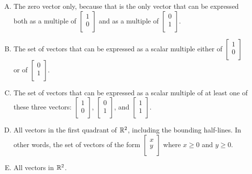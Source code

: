 \documentclass[10pt]{amsart}
\begin{document}
\begin{enumerate}
  \begin{enumerate}[(A)]
  \item The zero vector only, because that is the only vector that can
    be expressed both as a multiple of $\left[\begin{matrix} 1 \\ 0
        \\\end{matrix}\right]$ and as a multiple of
    $\left[\begin{matrix} 0 \\ 1 \\\end{matrix}\right]$.
  \item The set of vectors that can be expressed as a scalar multiple
    either of $\left[\begin{matrix} 1 \\ 0 \\\end{matrix}\right]$ or
    of $\left[\begin{matrix} 0 \\ 1 \\\end{matrix}\right]$.
  \item The set of vectors that can be expressed as a scalar multiple
    of at least one of these three vectors: $\left[\begin{matrix} 1
        \\ 0 \\\end{matrix}\right]$, $\left[\begin{matrix} 0 \\ 1
        \\\end{matrix}\right]$, and $\left[\begin{matrix} 1 \\ 1
        \\\end{matrix}\right]$.
  \item All vectors in the first quadrant of $\mathbb{R}^2$, including the
    bounding half-lines. In other words, the set of vectors of the
    form $\left[\begin{matrix} x \\ y \\\end{matrix}\right]$ where $x
    \ge 0$ and $y \ge 0$.
  \item All vectors in $\mathbb{R}^2$.
  \end{enumerate}


\end{enumerate}
\end{document}

